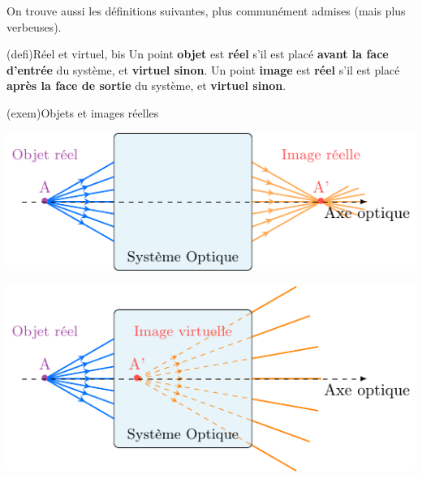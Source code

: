 \documentclass[../../main/main.tex]{subfiles}
\begin{document}
On trouve aussi les définitions suivantes, plus communément admises (mais plus
verbeuses).

\begin{tcb}[label=reelvirt2, sidebyside](defi){{Réel et virtuel, bis}}
	Un point \textbf{objet} est \textbf{réel} s'il est placé \textbf{avant la
		face d'entrée} du système, et \textbf{virtuel sinon}.
	\tcblower
	Un point \textbf{image} est \textbf{réel} s'il est placé \textbf{après la
		face de sortie} du système, et \textbf{virtuel sinon}.
\end{tcb}

\begin{tcb}[label=exem:rellvirt](exem){Objets et images réelles}
	\begin{minipage}{0.45\linewidth}
		\begin{center}
			\includegraphics[width=\linewidth]{obj_r-img_r}
			\label{fig:objrimgr}
		\end{center}
	\end{minipage}
	\hfill
	\begin{minipage}{0.45\linewidth}
		\begin{center}
			\includegraphics[width=\linewidth]{obj_r-img_v}
			\label{fig:objrimgv}
		\end{center}
	\end{minipage}
	\begin{minipage}{0.45\linewidth}
		\begin{center}

\end{center}
\end{minipage}
\end{tcb}
\end{document}
